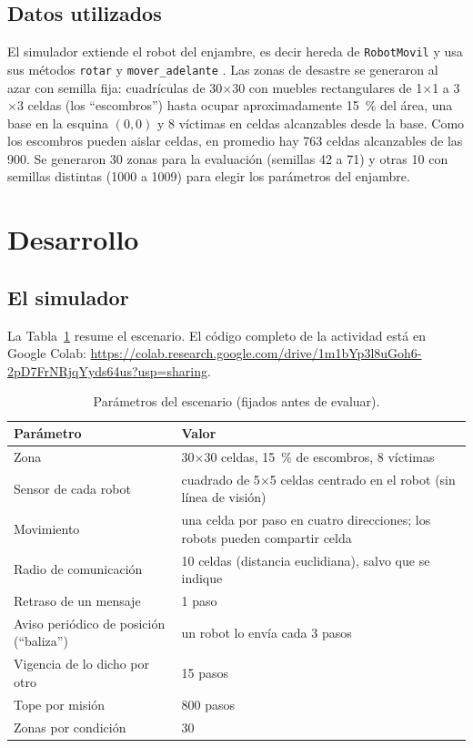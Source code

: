 \documentclass[11pt,letterpaper]{article}
\begin{document}
\subsection*{Datos utilizados}

El simulador extiende el robot del enjambre, es decir hereda de \texttt{RobotMovil} y usa sus métodos \texttt{rotar} y \texttt{mover\_adelante} \parencite{iae_u4_t46}. Las zonas de desastre se generaron al azar con semilla fija: cuadrículas de 30$\times$30 con muebles rectangulares de 1$\times$1 a 3$\times$3 celdas (los ``escombros'') hasta ocupar aproximadamente 15~\% del área, una base en la esquina $(0, 0)$ y 8 víctimas en celdas alcanzables desde la base. Como los escombros pueden aislar celdas, en promedio hay 763 celdas alcanzables de las 900. Se generaron 30 zonas para la evaluación (semillas 42 a 71) y otras 10 con semillas distintas (1000 a 1009) para elegir los parámetros del enjambre.

\newpage

\section{Desarrollo}

\subsection{El simulador}

La Tabla~\ref{tab:param} resume el escenario. El código completo de la actividad está en Google Colab:\newline
\url{https://colab.research.google.com/drive/1m1bYp3l8uGoh6-2pD7FrNRjqYyds64us?usp=sharing}.


\begin{table}[H]
\centering
\caption{Parámetros del escenario (fijados antes de evaluar).}
\label{tab:param}
\small
\begin{tabular}{@{}p{5.2cm}p{7.5cm}@{}}
\toprule
Parámetro & Valor \\
\midrule
Zona & 30$\times$30 celdas, 15~\% de escombros, 8 víctimas \\
Sensor de cada robot & cuadrado de 5$\times$5 celdas centrado en el robot (sin línea de visión) \\
Movimiento & una celda por paso en cuatro direcciones; los robots pueden compartir celda \\
Radio de comunicación & 10 celdas (distancia euclidiana), salvo que se indique \\
Retraso de un mensaje & 1 paso \\
Aviso periódico de posición (``baliza'') & un robot lo envía cada 3 pasos \\
Vigencia de lo dicho por otro & 15 pasos \\
Tope por misión & 800 pasos \\
Zonas por condición & 30 \\
\bottomrule
\end{tabular}
\end{table}
\end{document}
